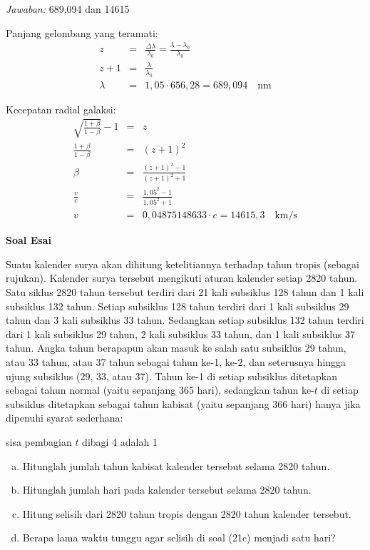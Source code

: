 \documentclass[11pt,fleqn]{exam}
\begin{document}
\begin{questions}
\textit{Jawaban: } 689,094 dan 14615

Panjang gelombang yang teramati:
\begin{eqnarray*}
z &=& \frac{\Delta \lambda}{\lambda_0} = \frac{\lambda - \lambda_0}{\lambda_0}\\
z + 1 &=& \frac{\lambda}{\lambda_0}\\
\lambda &=& 1,05 \cdot 656,28 = 689,094 \quad \text{nm}
\end{eqnarray*}

Kecepatan radial galaksi:
\begin{eqnarray*}
\sqrt{\frac{1 + \beta}{1 - \beta}} - 1 &=& z \\
\frac{1 + \beta}{1 - \beta} &=& (z + 1)^2 \\
\beta &=& \frac{(z + 1)^2 - 1}{(z + 1)^2 + 1} \\
\frac{v}{c} &=& \frac{1,05^2 - 1}{1,05^2 + 1} \\
v &=& 0,04875148633 \cdot c = 14615,3 \quad \text{km/s}
\end{eqnarray*}


\vspace{0.5cm}
\textbf{Soal Esai}

\question Suatu kalender surya akan dihitung ketelitiannya terhadap tahun tropis (sebagai rujukan). Kalender surya tersebut mengikuti aturan kalender setiap 2820 tahun. Satu siklus 2820 tahun tersebut terdiri dari 21 kali subsiklus 128 tahun dan 1 kali subsiklus 132 tahun. Setiap subsiklus 128 tahun terdiri dari 1 kali subsiklus 29 tahun dan 3 kali subsiklus 33 tahun. Sedangkan setiap subsiklus 132 tahun terdiri dari 1 kali subsiklus 29 tahun, 2 kali subsiklus 33 tahun, dan 1 kali subsiklus 37 tahun. Angka tahun berapapun akan masuk ke salah satu subsiklus 29 tahun, atau 33 tahun, atau 37 tahun sebagai tahun ke-1, ke-2, dan seterusnya hingga ujung subsiklus (29, 33, atau 37). Tahun ke-1 di setiap subsiklus ditetapkan sebagai tahun normal (yaitu sepanjang 365 hari), sedangkan tahun ke-$t$ di setiap subsiklus ditetapkan sebagai tahun kabisat (yaitu sepanjang 366 hari) hanya jika dipenuhi syarat sederhana:

\begin{center}
sisa pembagian $t$ dibagi 4 adalah 1\\
\end{center}

\begin{enumerate}[(a)]
\item Hitunglah jumlah tahun kabisat kalender tersebut selama 2820 tahun.
\item Hitunglah jumlah hari pada kalender tersebut selama 2820 tahun.
\item Hitung selisih dari 2820 tahun tropis dengan 2820 tahun kalender tersebut.
\item Berapa lama waktu tunggu agar selisih di soal (21c) menjadi satu hari? \\
\end{enumerate}



\end{questions}
\end{document}
